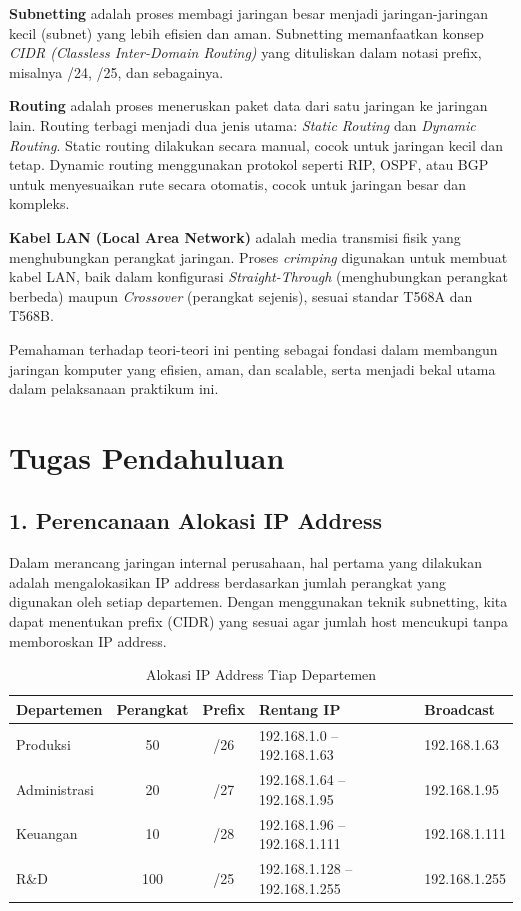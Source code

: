 \documentclass[12pt,a4paper]{article}
\begin{document}
\textbf{Subnetting} adalah proses membagi jaringan besar menjadi jaringan-jaringan kecil (subnet) yang lebih efisien dan aman. Subnetting memanfaatkan konsep \textit{CIDR (Classless Inter-Domain Routing)} yang dituliskan dalam notasi prefix, misalnya /24, /25, dan sebagainya.

\textbf{Routing} adalah proses meneruskan paket data dari satu jaringan ke jaringan lain. Routing terbagi menjadi dua jenis utama: \textit{Static Routing} dan \textit{Dynamic Routing}. Static routing dilakukan secara manual, cocok untuk jaringan kecil dan tetap. Dynamic routing menggunakan protokol seperti RIP, OSPF, atau BGP untuk menyesuaikan rute secara otomatis, cocok untuk jaringan besar dan kompleks.

\textbf{Kabel LAN (Local Area Network)} adalah media transmisi fisik yang menghubungkan perangkat jaringan. Proses \textit{crimping} digunakan untuk membuat kabel LAN, baik dalam konfigurasi \textit{Straight-Through} (menghubungkan perangkat berbeda) maupun \textit{Crossover} (perangkat sejenis), sesuai standar T568A dan T568B.

Pemahaman terhadap teori-teori ini penting sebagai fondasi dalam membangun jaringan komputer yang efisien, aman, dan scalable, serta menjadi bekal utama dalam pelaksanaan praktikum ini.

\section{Tugas Pendahuluan}

\subsection*{1. Perencanaan Alokasi IP Address}

Dalam merancang jaringan internal perusahaan, hal pertama yang dilakukan adalah mengalokasikan IP address berdasarkan jumlah perangkat yang digunakan oleh setiap departemen. Dengan menggunakan teknik subnetting, kita dapat menentukan prefix (CIDR) yang sesuai agar jumlah host mencukupi tanpa memboroskan IP address.

\begin{table}[H]
\centering
\begin{tabular}{|l|c|c|l|l|}
\hline
\textbf{Departemen} & \textbf{Perangkat} & \textbf{Prefix} & \textbf{Rentang IP} & \textbf{Broadcast} \\
\hline
Produksi & 50 & /26 & 192.168.1.0 – 192.168.1.63 & 192.168.1.63 \\
Administrasi & 20 & /27 & 192.168.1.64 – 192.168.1.95 & 192.168.1.95 \\
Keuangan & 10 & /28 & 192.168.1.96 – 192.168.1.111 & 192.168.1.111 \\
R\&D & 100 & /25 & 192.168.1.128 – 192.168.1.255 & 192.168.1.255 \\
\hline
\end{tabular}
\caption{Alokasi IP Address Tiap Departemen}
\end{table}
\end{document}
